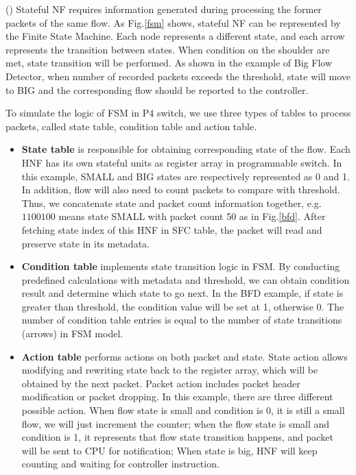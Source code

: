 \documentclass[10pt, conference, letterpaper]{IEEEtran}
\begin{document}
(\expandafter{}) Stateful NF requires information generated during processing the former packets of the same flow\cite{Gember-Jacobson2015}. As Fig.\ref{fsm} shows, stateful NF can be represented by the Finite State Machine. 
Each node represents a different state, and each arrow represents the transition between states. 
When condition on the shoulder are met, state transition will be performed. As shown in the example of Big Flow Detector, when number of recorded packets exceeds the threshold, state will move to BIG and the corresponding flow should be reported to the controller.

To simulate the logic of FSM in P4 switch, we use three types of tables to process packets, called state table, condition table and action table. 

\begin{itemize}
\item \textbf{State table} is responsible for obtaining corresponding state of the flow. Each HNF has its own stateful units as register array in programmable switch. In this example, SMALL and BIG states are respectively represented as 0 and 1. In addition, flow will also need to count packets to compare with threshold. Thus, we concatenate state and packet count information together, e.g. $1100100$ means state SMALL with packet count 50 as in Fig.\ref{bfd}. After fetching state index of this HNF in SFC table, the packet will read and preserve state in its metadata.
\end{itemize}

\begin{itemize}
\item \textbf{Condition table} implements state transition logic in FSM. By conducting predefined calculations with metadata and threshold, we can obtain condition result and determine which state to go next. In the BFD example, if state is greater than threshold, the condition value will be set at 1, otherwise 0. The number of condition table entries is equal to the number of state transitions (arrows) in FSM model.
\end{itemize}

\begin{itemize}
\item \textbf{Action table} performs actions on both packet and state. State action allows modifying and rewriting state back to the register array, which will be obtained by the next packet. Packet action includes packet header modification or packet dropping. 
In this example, there are three different possible action. When flow state is small and condition is 0, it is still a small flow, we will just increment the counter; when the flow state is small and condition is 1, it represents that flow state transition happens, and packet will be sent to CPU for notification; When state is big, HNF will keep counting and waiting for controller instruction.
\end{itemize} 
\end{document}
